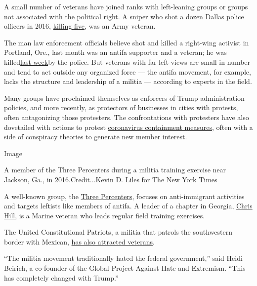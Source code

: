 A small number of veterans have joined ranks with left-leaning groups or
groups not associated with the political right. A sniper who shot a
dozen Dallas police officers in 2016,
\href{https://www.nbcnews.com/storyline/dallas-police-ambush/dallas-shooter-micah-xavier-johnson-was-army-veteran-n606101}{killing
five,} was an Army veteran.

The man law enforcement officials believe shot and killed a right-wing
activist in Portland, Ore., last month was an antifa supporter and a
veteran; he was
killed\href{https://www.nytimes3xbfgragh.onion/2020/09/03/us/michael-reinoehl-arrest-portland-shooting.html}{last
week}by the police. But veterans with far-left views are small in number
and tend to act outside any organized force --- the antifa movement, for
example, lacks the structure and leadership of a militia --- according
to experts in the field.

Many groups have proclaimed themselves as enforcers of Trump
administration policies, and more recently, as protectors of businesses
in cities with protests, often antagonizing those protesters. The
confrontations with protesters have also dovetailed with actions to
protest
\href{https://www.nytimes3xbfgragh.onion/2020/05/03/us/coronavirus-extremists.html}{coronavirus
containment measures}, often with a side of conspiracy theories to
generate new member interest.

Image

A member of the Three Percenters during a militia training exercise near
Jackson, Ga., in 2016.Credit...Kevin D. Liles for The New York Times

A well-known group, the
\href{https://www.adl.org/resources/backgrounders/three-percenters}{Three
Percenters}, focuses on anti-immigrant activities and targets leftists
like members of antifa. A leader of a chapter in Georgia,
\href{https://www.nytimes3xbfgragh.onion/2016/11/05/us/a-militia-gets-battle-ready-for-a-gun-grabbing-clinton-presidency.html}{Chris
Hill}, is a Marine veteran who leads regular field training exercises.

The United Constitutional Patriots, a militia that patrols the
southwestern border with Mexican,
\href{https://www.nytimes3xbfgragh.onion/2019/04/23/us/new-mexico-militia-border.html}{has
also attracted veterans}.

``The militia movement traditionally hated the federal government,''
said Heidi Beirich, a co-founder of the Global Project Against Hate and
Extremism. ``This has completely changed with Trump.''

